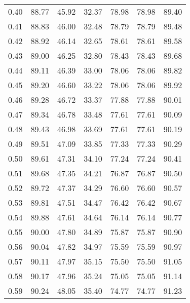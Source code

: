 \begin{tabular}{|c|c|c|c|c|c|c|}
      0.40 &     88.77 &     45.92 &      32.37 &   78.98 &      78.98 &         89.40 \\
      0.41 &     88.83 &     46.00 &      32.48 &   78.79 &      78.79 &         89.48 \\
      0.42 &     88.92 &     46.14 &      32.65 &   78.61 &      78.61 &         89.58 \\
      0.43 &     89.00 &     46.25 &      32.80 &   78.43 &      78.43 &         89.68 \\
      0.44 &     89.11 &     46.39 &      33.00 &   78.06 &      78.06 &         89.82 \\
      0.45 &     89.20 &     46.60 &      33.22 &   78.06 &      78.06 &         89.92 \\
      0.46 &     89.28 &     46.72 &      33.37 &   77.88 &      77.88 &         90.01 \\
      0.47 &     89.34 &     46.78 &      33.48 &   77.61 &      77.61 &         90.09 \\
      0.48 &     89.43 &     46.98 &      33.69 &   77.61 &      77.61 &         90.19 \\
      0.49 &     89.51 &     47.09 &      33.85 &   77.33 &      77.33 &         90.29 \\
      0.50 &     89.61 &     47.31 &      34.10 &   77.24 &      77.24 &         90.41 \\
      0.51 &     89.68 &     47.35 &      34.21 &   76.87 &      76.87 &         90.50 \\
      0.52 &     89.72 &     47.37 &      34.29 &   76.60 &      76.60 &         90.57 \\
      0.53 &     89.81 &     47.51 &      34.47 &   76.42 &      76.42 &         90.67 \\
      0.54 &     89.88 &     47.61 &      34.64 &   76.14 &      76.14 &         90.77 \\
      0.55 &     90.00 &     47.80 &      34.89 &   75.87 &      75.87 &         90.90 \\
      0.56 &     90.04 &     47.82 &      34.97 &   75.59 &      75.59 &         90.97 \\
      0.57 &     90.11 &     47.97 &      35.15 &   75.50 &      75.50 &         91.05 \\
      0.58 &     90.17 &     47.96 &      35.24 &   75.05 &      75.05 &         91.14 \\
      0.59 &     90.24 &     48.05 &      35.40 &   74.77 &      74.77 &         91.23 \\

\end{tabular}
